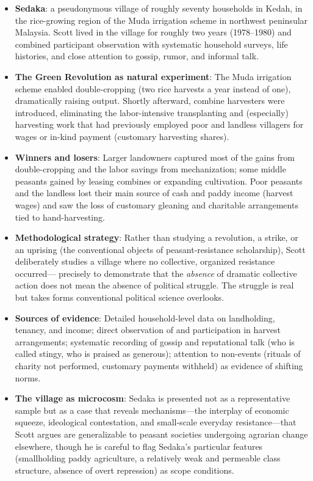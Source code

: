 \documentclass[12pt]{article}
\begin{document}
\begin{itemize}[leftmargin=*, itemsep=4pt]
    \item \textbf{Sedaka}: a pseudonymous village of roughly seventy households in Kedah, in the rice-growing region of the Muda irrigation scheme in northwest peninsular Malaysia. Scott lived in the village for roughly two years (1978--1980) and combined participant observation with systematic household surveys, life histories, and close attention to gossip, rumor, and informal talk.
    \item \textbf{The Green Revolution as natural experiment}: The Muda irrigation scheme enabled double-cropping (two rice harvests a year instead of one), dramatically raising output. Shortly afterward, combine harvesters were introduced, eliminating the labor-intensive transplanting and (especially) harvesting work that had previously employed poor and landless villagers for wages or in-kind payment (customary harvesting shares).
    \item \textbf{Winners and losers}: Larger landowners captured most of the gains from double-cropping and the labor savings from mechanization; some middle peasants gained by leasing combines or expanding cultivation. Poor peasants and the landless lost their main source of cash and paddy income (harvest wages) and saw the loss of customary gleaning and charitable arrangements tied to hand-harvesting.
    \item \textbf{Methodological strategy}: Rather than studying a revolution, a strike, or an uprising (the conventional objects of peasant-resistance scholarship), Scott deliberately studies a village where no collective, organized resistance occurred--- precisely to demonstrate that the \emph{absence} of dramatic collective action does not mean the absence of political struggle. The struggle is real but takes forms conventional political science overlooks.
    \item \textbf{Sources of evidence}: Detailed household-level data on landholding, tenancy, and income; direct observation of and participation in harvest arrangements; systematic recording of gossip and reputational talk (who is called stingy, who is praised as generous); attention to non-events (rituals of charity not performed, customary payments withheld) as evidence of shifting norms.
    \item \textbf{The village as microcosm}: Sedaka is presented not as a representative sample but as a case that reveals mechanisms---the interplay of economic squeeze, ideological contestation, and small-scale everyday resistance---that Scott argues are generalizable to peasant societies undergoing agrarian change elsewhere, though he is careful to flag Sedaka's particular features (smallholding paddy agriculture, a relatively weak and permeable class structure, absence of overt repression) as scope conditions.
\end{itemize}
\end{document}
